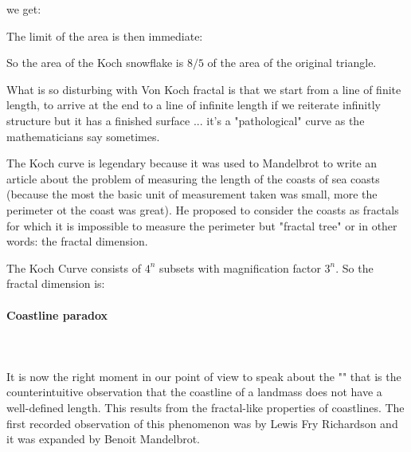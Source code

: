 	we get:
	
	The limit of the area is then immediate:
	
	So the area of the Koch snowflake is $8/5$ of the area of the original triangle. 
	
	What is so disturbing with Von Koch fractal is that we start from a line of finite length, to arrive at the end to a line of infinite length if we reiterate infinitly structure but it has a finished surface ... it's a "pathological" curve as the mathematicians say sometimes.
	
	The Koch curve is legendary because it was used to Mandelbrot to write an article about the problem of measuring the length of the coasts of sea coasts (because the most the basic unit of measurement taken was small, more the perimeter ot the coast was great). He proposed to consider the coasts as fractals for which it is impossible to measure the perimeter but "fractal tree" or in other words: the fractal dimension.
	
	The Koch Curve consists of $4^n$ subsets with magnification factor $3^n$. So the fractal dimension is:
	
	
	\paragraph{Coastline paradox}\mbox{}\\\\
	It is now the right moment in our point of view to speak about the "" that is the counterintuitive observation that the coastline of a landmass does not have a well-defined length. This results from the fractal-like properties of coastlines. The first recorded observation of this phenomenon was by Lewis Fry Richardson and it was expanded by Benoit Mandelbrot.

